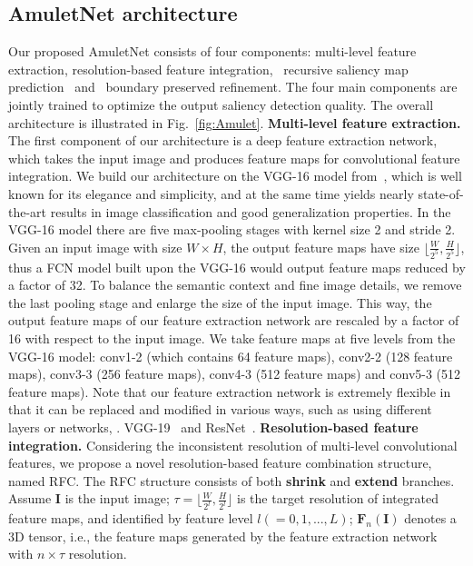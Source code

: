 \documentclass[10pt,twocolumn,letterpaper]{article}
\begin{document}
\subsection{AmuletNet architecture}
Our proposed AmuletNet consists of four components: multi-level feature extraction, resolution-based feature integration,~ recursive saliency map prediction~ and~ boundary preserved refinement.
The four main components are jointly trained to optimize the output saliency detection quality.
The overall architecture is illustrated in Fig.~\ref{fig:Amulet}.
{\flushleft\textbf{Multi-level feature extraction.}}
The first component of our architecture is a deep feature extraction network, which takes the input image and produces feature maps for convolutional feature integration.
We build our architecture on the VGG-16 model from~\cite{simonyan2014very}, which is well known for its elegance and simplicity, and at the same time yields nearly state-of-the-art results in image classification and good generalization properties. In the VGG-16 model there are five max-pooling stages with kernel size 2 and stride 2.
Given an input image with size $W\times H$, the output feature maps have size $\lfloor\frac{W}{2^5},\frac{H}{2^5}\rfloor$, thus a FCN model built upon the VGG-16 would output feature maps reduced by a factor of 32.
To balance the semantic context and fine image details, we remove the last pooling stage and enlarge the size of the input image.
This way, the output feature maps of our feature extraction network are rescaled by a factor of 16 with respect to the input image.
We take feature maps at five levels from the VGG-16 model: conv1-2 (which contains 64 feature maps), conv2-2 (128 feature maps), conv3-3 (256 feature maps), conv4-3 (512 feature maps) and conv5-3 (512 feature maps).
Note that our feature extraction network is extremely flexible in that it can be replaced and modified in various ways, such as using different layers or networks, \eg. VGG-19~\cite{simonyan2014very} and ResNet~\cite{He2016Deep}.\vspace{-2mm}
{\flushleft \textbf{Resolution-based feature integration.}}
Considering the inconsistent resolution of multi-level convolutional features, we propose a novel resolution-based feature combination structure, named RFC.
The RFC structure consists of both \textbf{shrink} and \textbf{extend} branches.
Assume $\textbf{I}$ is the input image; $\tau=\lfloor\frac{W}{2^l},\frac{H}{2^l}\rfloor$ is the target resolution of integrated feature maps, and identified by feature level $l(=0,1,...,L)$; $\textbf{F}_{n}(\textbf{I})$ denotes a 3D tensor, i.e., the feature maps generated by the feature extraction network with $n\times \tau$ resolution.
\end{document}
